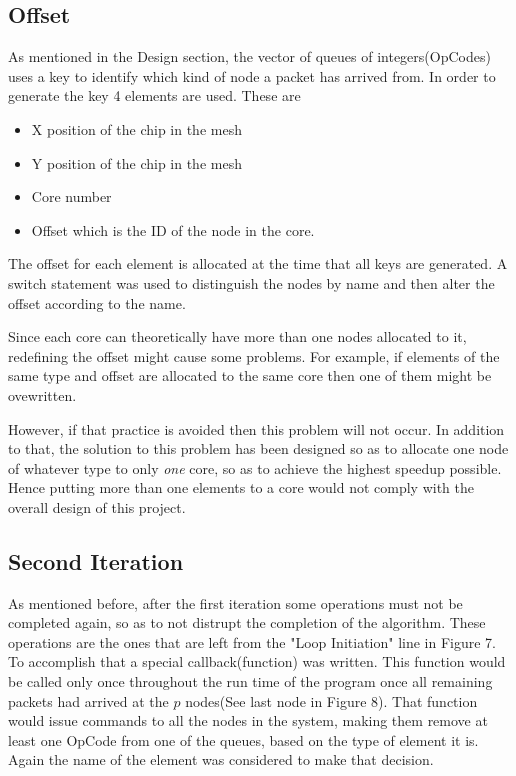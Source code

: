 \documentclass[12pt,a4paper]{article}
\begin{document}
\subsection{Offset}
As mentioned in the Design section, the vector of queues of integers(OpCodes) uses a key to identify which kind of node a packet has arrived from. In order to generate the key 4 elements are used. These are
\begin{itemize}
\item X position of the chip in the mesh
\item Y position of the chip in the mesh
\item Core number
\item Offset which is the ID of the node in the core.
\end{itemize}
The offset for each element is allocated at the time that all keys are generated. A switch statement was used to distinguish the nodes by name and then alter the offset according to the name. 

Since each core can theoretically have more than one nodes allocated to it, redefining the offset might cause some problems. For example, if elements of the same type and offset are allocated to the same core then one of them might be ovewritten. 

However, if that practice is avoided then this problem will not occur. In addition to that, the solution to this problem has been designed so as to allocate one node of whatever type to only \emph{one} core, so as to achieve the highest speedup possible. Hence putting more than one elements to a core would not comply with the overall design of this project.
\subsection{Second Iteration}
As mentioned before, after the first iteration some operations must not be completed again, so as to not distrupt the completion of the algorithm. These operations are the ones that are left from the "Loop Initiation" line in Figure 7. To accomplish that a special callback(function) was written. This function would be called only once throughout the run time of the program once all remaining packets had arrived at the $p$ nodes(See last node in Figure 8). That function would issue commands to all the nodes in the system, making them remove at least one OpCode from one of the queues, based on the type of element it is. Again the name of the element was considered to make that decision.
\end{document}
